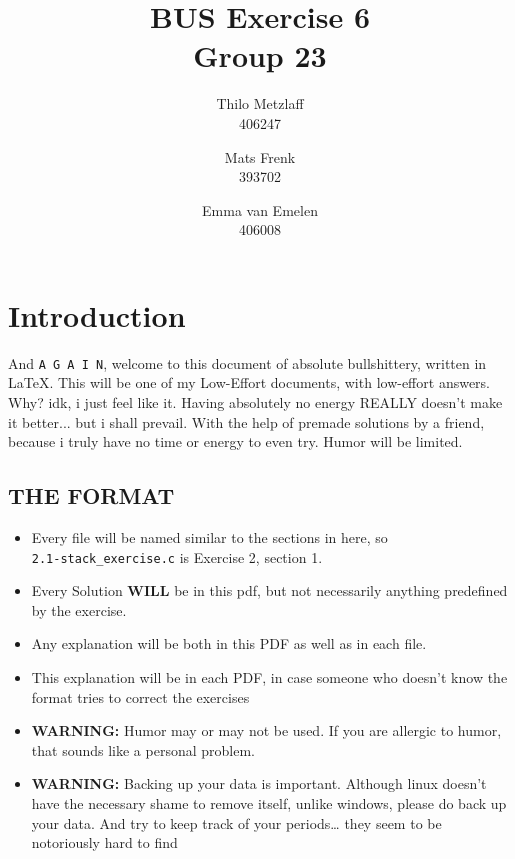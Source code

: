 \documentclass[a4paper, 11pt]{article}
\author{Thilo Metzlaff\\406247 \and Mats Frenk\\393702\and Emma van Emelen\\406008}
\title{BUS Exercise 6 \\ Group 23}
\begin{document}
      \maketitle
      \newpage

      \tableofcontents
      \newpage

      \section*{Introduction}
      And \texttt{A G A I N}, welcome to this document of absolute bullshittery, written in \LaTeX. This will be one of my Low-Effort documents, with low-effort answers. Why? idk, i just feel like it.
      Having absolutely no energy REALLY doesn't make it better... but i shall prevail. With the help of premade solutions by a friend, because i truly have no time or energy to even try. Humor will be limited.


      \subsection*{THE FORMAT}
      \begin{itemize}
            \item Every file will be named similar to the sections in here, so\\
            \texttt{2.1-stack\_exercise.c} is Exercise 2, section 1.
            \item Every Solution \textbf{WILL} be in this pdf, but not necessarily 
                  anything predefined by the exercise.
            \item Any explanation will be both in this PDF as well as in each file.
            \item This explanation will be in each PDF, in case someone who doesn't
                  know the format tries to correct the exercises
            \item \textbf{WARNING:} Humor may or may not be used. If you are allergic
                  to humor, that sounds like a personal problem.
            \item \textbf{WARNING:} Backing up your data is important. Although linux 
                  doesn't have the necessary shame to remove itself, unlike windows,
                  please do back up your data. And try to keep track of your periods\dots
                  they seem to be notoriously hard to find
      \end{itemize}
      \newpage
\end{document}
